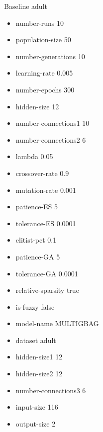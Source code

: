 Baseline
adult
\begin{itemize}
\item number-runs 10
\item population-size 50
\item number-generations 10
\item learning-rate 0.005
\item number-epochs 300
\item hidden-size 12
\item number-connections1 10
\item number-connections2 6
\item lambda 0.05
\item crossover-rate 0.9
\item mutation-rate 0.001
\item patience-ES 5
\item tolerance-ES 0.0001
\item elitist-pct 0.1
\item patience-GA 5
\item tolerance-GA 0.0001
\item relative-sparsity true
\item is-fuzzy false
\item model-name MULTIGBAG
\item dataset adult
\item hidden-size1 12
\item hidden-size2 12
\item number-connections3 6
\item input-size 116
\item output-size 2
\end{itemize}

